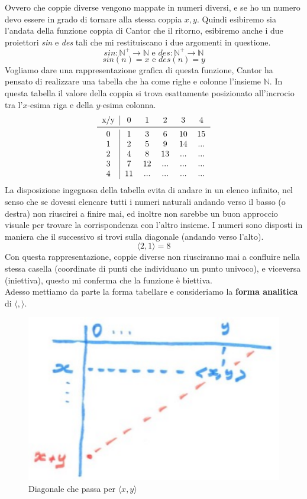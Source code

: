\documentclass{article}
\begin{document}
Ovvero che coppie diverse vengono mappate in numeri diversi, e se
ho un numero devo essere in grado di tornare alla stessa coppia $x,y$. Quindi esibiremo sia
l'andata della funzione coppia di Cantor che il ritorno, esibiremo anche i due proiettori
\textit{sin} e \textit{des} tali che mi restituiscano i due argomenti in questione.
$$sin:\mathbb{N}^+\rightarrow\mathbb{N}\text{ e }des:\mathbb{N}^+\rightarrow\mathbb{N}$$
$$sin(n)=x\text{ e }des(n)=y$$
Vogliamo dare una rappresentazione grafica di questa funzione, Cantor ha pensato di realizzare
una tabella che ha come righe e colonne l'insieme $\mathbb{N}$. In questa tabella
il valore della coppia si trova esattamente posizionato all'incrocio tra l'$x$-esima riga
e della $y$-esima colonna.
\[
    \begin{tabular}{c|ccccc}
        x/y & 0  & 1   & 2   & 3   & 4   \\
        \midrule
        0   & 1  & 3   & 6   & 10  & 15  \\
        1   & 2  & 5   & 9   & 14  & ... \\
        2   & 4  & 8   & 13  & ... & ... \\
        3   & 7  & 12  & ... & ... & ... \\
        4   & 11 & ... & ... & ... & ... \\
    \end{tabular}
\]
La disposizione ingegnosa della tabella evita di andare in un elenco infinito,
nel senso che se dovessi elencare tutti i numeri naturali andando verso il basso (o
destra) non riuscirei a finire mai, ed inoltre non sarebbe un buon approccio visuale per trovare
la corrispondenza con l'altro insieme. I numeri sono disposti in maniera che il successivo
si trovi sulla diagonale (andando verso l'alto).
$$\langle 2,1\rangle =8$$
Con questa rappresentazione, coppie diverse non riusciranno mai a confluire nella stessa
casella (coordinate di punti che individuano un punto univoco), e viceversa (iniettiva),
questo mi conferma che la funzione è biettiva.\\Adesso mettiamo da parte la forma tabellare e
consideriamo la \textbf{forma analitica} di $\langle ,\rangle $.
\begin{figure}[H]
    \centering
    \includegraphics[scale=0.5]{images/coord_dim.png}
    \caption{Diagonale che passa per $\langle x,y\rangle $}
\end{figure}
\end{document}
